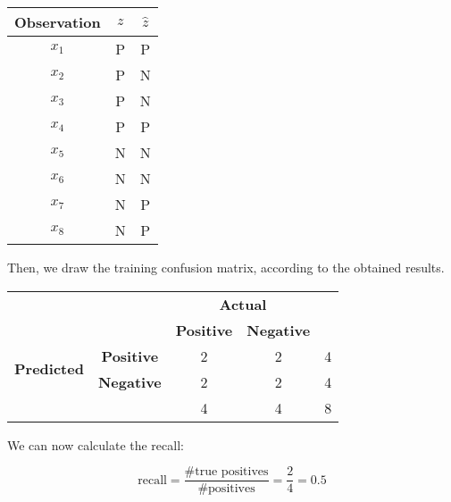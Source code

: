 \documentclass[12pt]{article}
\begin{document}
\begin{enumerate}[leftmargin=\labelsep]
          \begin{center}
              \captionsetup{type=table}
              \begin{tabular}{c|c|c}
                  Observation & \(z\) & \(\hat{z}\) \\
                  \hline
                  \(x_1\)     & P     & P           \\
                  \(x_2\)     & P     & N           \\
                  \(x_3\)     & P     & N           \\
                  \(x_4\)     & P     & P           \\
                  \(x_5\)     & N     & N           \\
                  \(x_6\)     & N     & N           \\
                  \(x_7\)     & N     & P           \\
                  \(x_8\)     & N     & P
              \end{tabular}
          \end{center}

          Then, we draw the training confusion matrix, according to the obtained results.

          \begin{center}
              \captionsetup{type=table}
              \begin{tabular}{|c|c|c|c|c|}
                  \cline{3-4}
                  \multicolumn{2}{c}{}                & \multicolumn{2}{|c|}{\textbf{Actual}} & \multicolumn{1}{c}{}                            \\
                  \cline{3-4}
                  \multicolumn{2}{c|}{}               & \textbf{Positive}                     & \textbf{Negative}    & \multicolumn{1}{c}{}     \\
                  \hline
                  \multirow{2}{*}{\textbf{Predicted}} & \textbf{Positive}                     & 2                    & 2                    & 4 \\
                  \cline{2-5}
                                                      & \textbf{Negative}                     & 2                    & 2                    & 4 \\
                  \hline
                  \multicolumn{2}{c|}{}               & 4                                     & 4                    & 8                        \\
                  \cline{3-5}
              \end{tabular}
          \end{center}

          We can now calculate the recall:

          \[
              \text{recall} = \frac{\#\text{true positives}}{\#\text{positives}} = \frac{2}{4} = 0.5
          \]

\end{enumerate}
\end{document}
